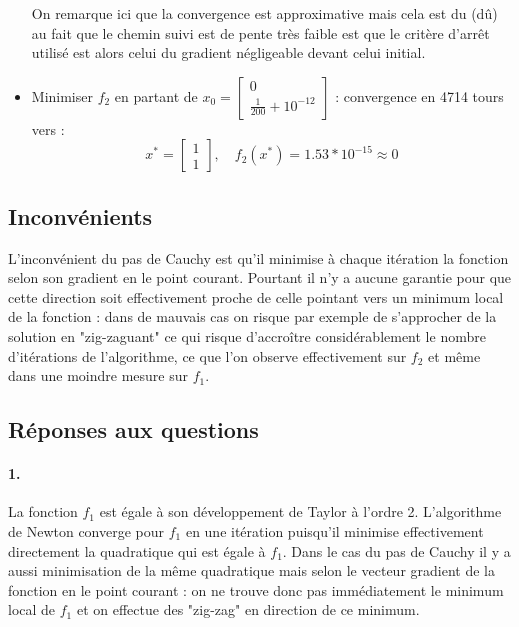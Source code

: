 \documentclass[12pt]{article}	%
\begin{document}
\begin{itemize}
		On remarque ici que la convergence est approximative mais cela est du (dû) au fait que le chemin suivi est de pente très faible est que le critère d'arrêt utilisé est alors celui du gradient négligeable devant celui initial.
	\item Minimiser $f_2$ en partant de $x_0 = \left[\begin{array}{c}0\\\frac{1}{200} + 10^{-12}\end{array}\right]$ : convergence en 4714 tours vers :
			\[x^* = \left[\begin{array}{c}1\\1\end{array}\right],\quad f_2(x^*) = 1.53*10^{-15} \approx 0\]
\end{itemize}


\subsection{Inconvénients}
L'inconvénient du pas de Cauchy est qu'il minimise à chaque itération la fonction selon son gradient en le point courant. Pourtant il n'y a aucune garantie pour que cette direction soit effectivement proche de celle pointant vers un minimum local de la fonction : dans de mauvais cas on risque par exemple de s'approcher de la solution en "zig-zaguant" ce qui risque d'accroître considérablement le nombre d'itérations de l'algorithme, ce que l'on observe effectivement sur $f_2$ et même dans une moindre mesure sur $f_1$.

\subsection{Réponses aux questions}
\paragraph{1.}
La fonction $f_1$ est égale à son développement de Taylor à l'ordre 2.
L'algorithme de Newton converge pour $f_1$ en une itération puisqu'il minimise effectivement directement la quadratique qui est égale à $f_1$. Dans le cas du pas de Cauchy il y a aussi minimisation de la même quadratique mais selon le vecteur gradient de la fonction en le point courant : on ne trouve donc pas immédiatement le minimum local de $f_1$ et on effectue des "zig-zag" en direction de ce minimum.
\end{document}
